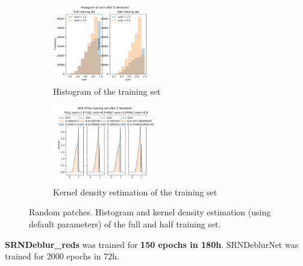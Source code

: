 \begin{enumerate}
\begin{figure}[H]
\begin{subfigure}{0.475\textwidth}
            \centering
            \includegraphics[width=0.5\textwidth,keepaspectratio]{subsections/srndeblur/histogram.pdf}
            \caption{Histogram of the training set}
        \end{subfigure}
        \begin{subfigure}{0.475\textwidth}
            \centering
            \includegraphics[width=0.5\textwidth,keepaspectratio]{subsections/srndeblur/kde.pdf}
            \caption{Kernel density estimation of the training set}
            \label{kde_train}
        \end{subfigure}
        \caption{Random patches. Histogram and kernel density estimation (using default parameters) of the full and half training set.}
    \end{figure}
\end{enumerate}

\textbf{SRNDeblur\_reds} was trained for \textbf{150 epochs in {\raisebox{0.5ex}{\texttildelow}} 180h}. SRN\-DeblurNet\cite{SRN-DeblurNet} was trained for 2000 epochs in 72h. 

